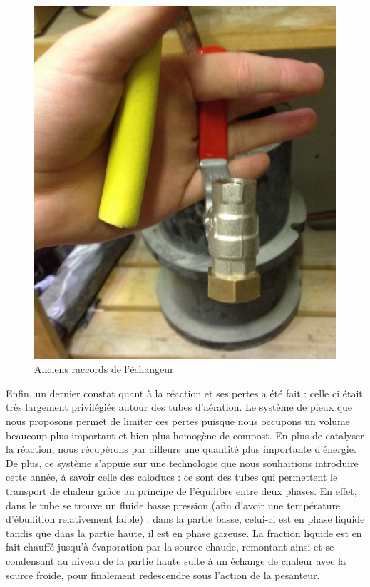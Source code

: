 \documentclass[../PS6_RapportFinal.tex]{subfiles}
\begin{document}
\begin{figure}[!h]
\begin{center}
\includegraphics[scale=0.06]{3_1_Anciens_raccords.JPG}
\caption{Anciens raccords de l'échangeur}
\end{center}
\end{figure}

%

Enfin, un dernier constat quant à la réaction et ses pertes a été fait : celle ci était très largement privilégiée autour des tubes d’aération. Le système de pieux que nous proposons permet de limiter ces pertes puisque nous occupons un volume beaucoup plus important et bien plus homogène de compost. En plus de catalyser la réaction, nous récupérons par ailleurs une quantité plus importante d’énergie.
De plus, ce système s'appuie sur une technologie que nous souhaitions introduire cette année, à savoir celle des caloducs : ce sont des tubes qui permettent le transport de chaleur grâce au principe de l'équilibre entre deux phases. En effet, dans le tube se trouve un fluide  basse pression (afin d'avoir une température d'ébullition relativement faible) : dans la partie basse, celui-ci est en phase liquide tandis que dans la partie haute, il est en phase gazeuse. La fraction liquide est en fait chauffé jusqu'à évaporation par la source chaude, remontant ainsi et se condensant au niveau de la partie haute suite à un échange de chaleur avec la source froide, pour finalement redescendre sous l'action de la pesanteur.
\end{document}
